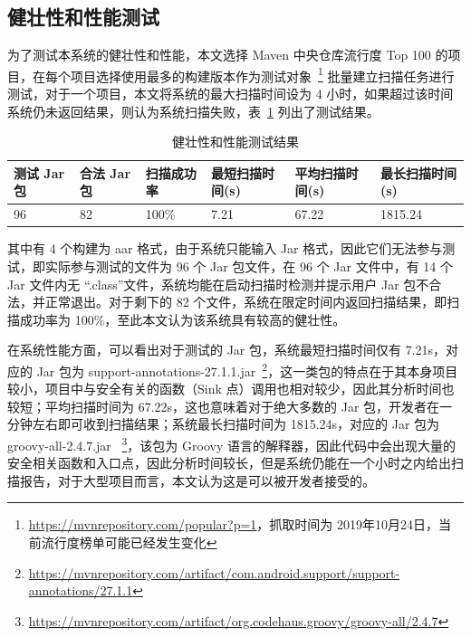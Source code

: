 \subsection{健壮性和性能测试}

为了测试本系统的健壮性和性能，本文选择 Maven 中央仓库流行度 Top 100 的项目，在每个项目选择使用最多的构建版本作为测试对象~\footnote{\url{https://mvnrepository.com/popular?p=1}，抓取时间为 2019年10月24日，当前流行度榜单可能已经发生变化} 批量建立扫描任务进行测试，对于一个项目，本文将系统的最大扫描时间设为 4 小时，如果超过该时间系统仍未返回结果，则认为系统扫描失败，表~\ref{robustTest} 列出了测试结果。

\begin{table}[!htb]\footnotesize
    \centering
    \caption{健壮性和性能测试结果}
    \begin{tabular}{llllll}
        \toprule
        \textbf{测试 Jar 包}&\textbf{合法 Jar 包} & \textbf{扫描成功率} &\textbf{最短扫描时间(s)}&\textbf{平均扫描时间(s)} & \textbf{最长扫描时间(s)} \\
        \midrule
        96 & 82 & 100\%  & 7.21 & 67.22 &1815.24 \\
        \bottomrule
    \end{tabular}
    \label{robustTest}
\end{table}

其中有 4 个构建为 aar 格式，由于系统只能输入 Jar 格式，因此它们无法参与测试，即实际参与测试的文件为 96 个 Jar 包文件，在 96 个 Jar 文件中，有 14 个Jar 文件内无 “.class”文件，系统均能在启动扫描时检测并提示用户 Jar 包不合法，并正常退出。对于剩下的 82 个文件，系统在限定时间内返回扫描结果，即扫描成功率为 100\%，至此本文认为该系统具有较高的健壮性。

在系统性能方面，可以看出对于测试的 Jar 包，系统最短扫描时间仅有 7.21s，对应的 Jar 包为 support-annotations-27.1.1.jar~\footnote{\url{https://mvnrepository.com/artifact/com.android.support/support-annotations/27.1.1}}，这一类包的特点在于其本身项目较小，项目中与安全有关的函数（Sink 点）调用也相对较少，因此其分析时间也较短；平均扫描时间为 67.22s，这也意味着对于绝大多数的 Jar 包，开发者在一分钟左右即可收到扫描结果；系统最长扫描时间为 1815.24s，对应的 Jar 包为 groovy-all-2.4.7.jar ~\footnote{\url{https://mvnrepository.com/artifact/org.codehaus.groovy/groovy-all/2.4.7}}，该包为 Groovy 语言的解释器，因此代码中会出现大量的安全相关函数和入口点，因此分析时间较长，但是系统仍能在一个小时之内给出扫描报告，对于大型项目而言，本文认为这是可以被开发者接受的。

